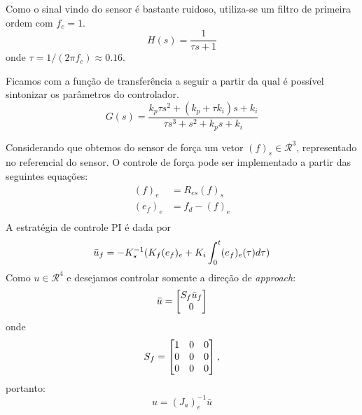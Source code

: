Como o sinal vindo do sensor é bastante ruidoso, utiliza-se um filtro de primeira ordem com $f_c = 1$.
\begin{equation}
H(s) = \frac{1}{\tau s + 1}
\end{equation}
onde $\tau = 1/(2 \pi f_c) \approx 0.16$.

Ficamos com a função de transferência a seguir a partir da qual é possível sintonizar os parâmetros do controlador.
\begin{equation}
G(s) = \frac{k_p \tau s^2 + (k_p + \tau k_i)s + k_i}{\tau s^3 + s^2 + k_p s + k_i}
\end{equation}

Considerando que obtemos do sensor de força um vetor $({f})_s \in \mathcal{R}^3$, representado no referencial do sensor. O controle de força pode ser implementado a partir das seguintes equações:
\begin{align}
({f})_e &= {R}_{es} ({f})_s \\
({e}_f)_e &= {f}_d - ({f})_e \\
\end{align}
A estratégia de controle PI é dada por
\begin{equation}
\bar{{u}}_f = -{K}_s^{-1} ({K}_f ({e}_f)_e + {K}_i \int_0^t ({e}_f)_e (\tau)d\tau)\\
\end{equation}
Como ${u} \in \mathcal{R}^4$  e desejamos controlar somente a direção de \textit{approach}:
\begin{equation}
\bar{{u}} = \begin{bmatrix} {S}_f \bar{{u}}_f \\ 0\end{bmatrix} 
\end{equation}
onde 
\begin{equation}
{S}_f = \begin{bmatrix}
  1 & 0 & 0 \\
  0 & 0 & 0 \\
  0 & 0 & 0
\end{bmatrix},
\end{equation}
portanto:
\begin{equation}
{u} = ({J_a})_e^{-1} \bar{{u}}
\end{equation}




